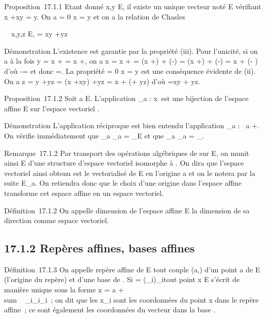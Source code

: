 \documentclass[]{article}
\begin{document}
Proposition~17.1.1 Etant donné x,y \in E, il existe un unique vecteur noté
\overrightarrowxy \in\overrightarrow
E vérifiant x +\overrightarrow xy = y. On a
\overrightarrowxy = 0 \Leftrightarrow x
= y et on a la relation de Chasles

\forall~~x,y,z \in E,
\overrightarrowxz =\overrightarrow
xy +\overrightarrow yz

Démonstration L'existence est garantie par la propriété (iii). Pour
l'unicité, si on a à la fois y = x +\overrightarrow \xi
= x +\overrightarrow \eta, on a x = x
+ = (x
+\overrightarrow \xi) +
(-\overrightarrow\xi) = (x
+\overrightarrow \eta) +
(-\overrightarrow\xi) = x +
(\overrightarrow\eta -\overrightarrow
\xi) d'où \overrightarrow\xi
-\overrightarrow \eta = et donc \overrightarrow\xi
=\overrightarrow \eta. La propriété
\overrightarrowxy = 0 \Leftrightarrow x
= y est une conséquence évidente de (ii). On a z = y
+\overrightarrow yz = (x
+\overrightarrow xy)
+\overrightarrow yz = x +
(\overrightarrowxy +\overrightarrow
yz) d'où \overrightarrowxz
=\overrightarrow xy +\overrightarrow
yz.

Proposition~17.1.2 Soit a \in E. L'application \phi_a :
x\mapsto~\overrightarrowax est
une bijection de l'espace affine E sur l'espace vectoriel
\overrightarrowE.

Démonstration L'application réciproque est bien entendu l'application
\psi_a :\overrightarrow
\xi\mapsto~a +\overrightarrow \xi.
On vérifie immédiatement que \psi_a \cdot \phi_a =
\mathrmId_E et que \phi_a \cdot \psi_a
=
\mathrmId_\overrightarrowE.

Remarque~17.1.2 Par transport des opérations algébriques de
\overrightarrowE sur E, on munit ainsi E d'une
structure d'espace vectoriel isomorphe à
\overrightarrowE. On dira que l'espace vectoriel
ainsi obtenu est le vectorialisé de E en l'origine a et on le notera par
la suite E_a. On retiendra donc que le choix d'une origine dans
l'espace affine transforme cet espace affine en un espace vectoriel.

Définition~17.1.2 On appelle dimension de l'espace affine E la dimension
de sa direction \overrightarrowE comme espace
vectoriel.

\subsection{17.1.2 Repères affines, bases affines}

Définition~17.1.3 On appelle repère affine de E tout couple (a,) d'un
point a de E (l'origine du repère) et d'une base  de
\overrightarrowE. Si  =
(\vece_i)_i\inI tout point x \in E
s'écrit de manière unique sous la forme x = a
+ \\sum ~
_i\inIx_i\vece_i~; on dit que
les x_i sont les coordonnées du point x dans le repère affine~;
ce sont également les coordonnées du vecteur
\overrightarrowax dans la base .
\end{document}
